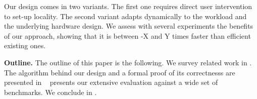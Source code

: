 Our design comes in two variants.
The first one requires direct user intervention to set-up locality.
The second variant adapts dynamically to the workload and the underlying hardware design.
We assess with several experiments the benefits of our approach, showing that it is between -X and Y times faster than efficient existing ones.

\textbf{Outline.}
The outline of this paper is the following.
We survey related work in .
The algorithm behind our design and a formal proof of its correctnesss are presented in ~
 presents our extensive evaluation against a wide set of benchmarks.
We conclude in .
